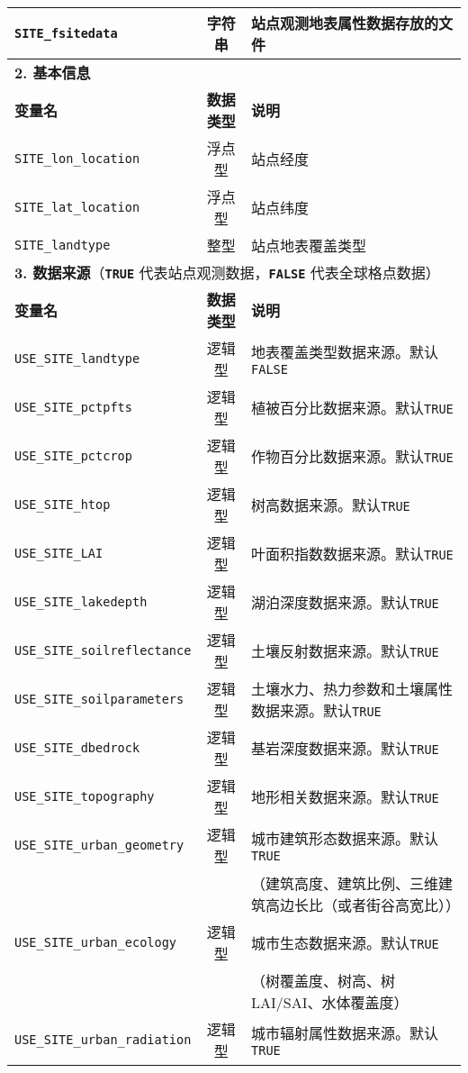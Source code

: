 \begin{longtable}{lcp{}}
\texttt{SITE\_fsitedata} & 字符串 & 站点观测地表属性数据存放的文件 \\
\midrule
\textbf{2. 基本信息} & & \\
\textbf{变量名} & \textbf{数据类型} & \textbf{说明} \\
\texttt{SITE\_lon\_location} & 浮点型 & 站点经度 \\
\texttt{SITE\_lat\_location} & 浮点型 & 站点纬度 \\
\texttt{SITE\_landtype} & 整型 & 站点地表覆盖类型 \\
\midrule
\multicolumn{3}{l}{\textbf{3. 数据来源}（\textbf{\texttt{TRUE}} 代表站点观测数据，\textbf{\texttt{FALSE}} 代表全球格点数据）} \\
\textbf{变量名} & \textbf{数据类型} & \textbf{说明} \\
\texttt{USE\_SITE\_landtype} & 逻辑型 & 地表覆盖类型数据来源。默认\texttt{FALSE} \\
\texttt{USE\_SITE\_pctpfts} & 逻辑型 & 植被百分比数据来源。默认\texttt{TRUE} \\
\texttt{USE\_SITE\_pctcrop} & 逻辑型 & 作物百分比数据来源。默认\texttt{TRUE} \\
\texttt{USE\_SITE\_htop} & 逻辑型 & 树高数据来源。默认\texttt{TRUE} \\
\texttt{USE\_SITE\_LAI} & 逻辑型 & 叶面积指数数据来源。默认\texttt{TRUE} \\
\texttt{USE\_SITE\_lakedepth} & 逻辑型 & 湖泊深度数据来源。默认\texttt{TRUE} \\
\texttt{USE\_SITE\_soilreflectance} & 逻辑型 & 土壤反射数据来源。默认\texttt{TRUE} \\
\texttt{USE\_SITE\_soilparameters} & 逻辑型 & 土壤水力、热力参数和土壤属性数据来源。默认\texttt{TRUE} \\
\texttt{USE\_SITE\_dbedrock} & 逻辑型 & 基岩深度数据来源。默认\texttt{TRUE} \\
\texttt{USE\_SITE\_topography} & 逻辑型 & 地形相关数据来源。默认\texttt{TRUE} \\
\texttt{USE\_SITE\_urban\_geometry} & 逻辑型 & 城市建筑形态数据来源。默认\texttt{TRUE} \\
& &（建筑高度、建筑比例、三维建筑高边长比（或者街谷高宽比）） \\
\texttt{USE\_SITE\_urban\_ecology} & 逻辑型 & 城市生态数据来源。默认\texttt{TRUE} \\
& &（树覆盖度、树高、树 LAI/SAI、水体覆盖度）\\
\texttt{USE\_SITE\_urban\_radiation} & 逻辑型 & 城市辐射属性数据来源。默认\texttt{TRUE} \\

\end{longtable}
